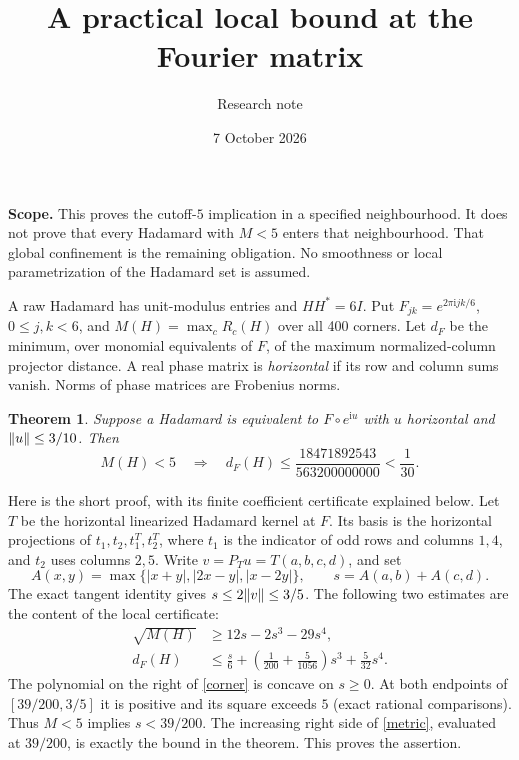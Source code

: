 \documentclass[11pt]{article}
\title{A practical local bound at the Fourier matrix}
\author{Research note}\date{7 October 2026}
\newtheorem{theorem}{Theorem}\newtheorem{lemma}{Lemma}
\newcommand{\ii}{\mathrm i}\newcommand{\perm}{\operatorname{perm}}
\begin{document}
\maketitle
\noindent\textbf{Scope.} This proves the cutoff-$5$ implication in a specified
neighbourhood. It does not prove that every Hadamard with $M<5$ enters that
neighbourhood. That global confinement is the remaining obligation.
No smoothness or local parametrization of the Hadamard set is assumed.

A raw Hadamard has unit-modulus entries and $HH^*=6I$. Put
$F_{jk}=e^{2\pi\ii jk/6}$, $0\le j,k<6$, and
$M(H)=\max_cR_c(H)$ over all 400 corners. Let $d_F$ be the minimum,
over monomial equivalents of $F$, of the maximum normalized-column
projector distance. A real phase matrix is \emph{horizontal} if its row
and column sums vanish. Norms of phase matrices are Frobenius norms.

\begin{theorem}\label{thm}
Suppose a Hadamard is equivalent to $F\circ e^{\ii u}$ with $u$ horizontal
and $\lVert u\rVert\le3/10$. Then
\[
 M(H)<5\quad\Longrightarrow\quad
 d_F(H)\le\frac{18471892543}{563200000000}<\frac1{30}.
\]
\end{theorem}

Here is the short proof, with its finite coefficient certificate explained
below. Let $T$ be the horizontal linearized Hadamard kernel at $F$. Its
basis is the horizontal projections of $t_1,t_2,t_1^T,t_2^T$, where $t_1$
is the indicator of odd rows and columns $1,4$, and $t_2$ uses columns
$2,5$. Write $v=P_Tu=T(a,b,c,d)$, and set
\[
 A(x,y)=\max\{|x+y|,|2x-y|,|x-2y|\},\qquad s=A(a,b)+A(c,d).
\]
The exact tangent identity gives $s\le2\lVert v\rVert\le3/5$.
The following two estimates are the content of the local certificate:
\begin{align}
 \sqrt{M(H)}&\ge 12s-2s^3-29s^4,\label{corner}\\
 d_F(H)&\le \frac{s}{6}
 +\left(\frac1{200}+\frac5{1056}\right)s^3+\frac5{32}s^4.\label{metric}
\end{align}
The polynomial on the right of \eqref{corner} is concave on $s\ge0$.
At both endpoints of $[39/200,3/5]$ it is positive and its square
exceeds $5$ (exact rational comparisons). Thus $M<5$ implies $s<39/200$.
The increasing right side of \eqref{metric}, evaluated at $39/200$, is
exactly the bound in the theorem. This proves the assertion.
\end{document}
